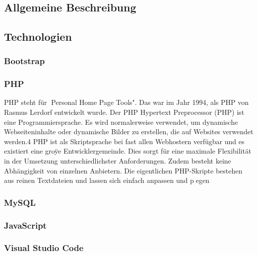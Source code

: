 \chapter{\docname}
\label{\docname}
\section{Allgemeine Beschreibung}

\section{Technologien}


\subsection{Bootstrap}


\subsection{PHP}
PHP steht f\"{u}r Personal Home Page Tools". Das war im Jahr 1994, als PHP
von Rasmus Lerdorf entwickelt wurde. Der PHP Hypertext Preprocessor (PHP)
ist eine Programmiersprache. Es wird normalerweise verwendet, um dynamische
Webseiteninhalte oder dynamische Bilder zu erstellen, die auf Websites verwendet
werden.4 PHP ist als Skriptsprache bei fast allen Webhostern verf\"{u}gbar und es
existiert eine gro\"{y}e Entwicklergemeinde. Dies sorgt f\"{u}r eine maximale Flexibilit\"{a}t
in der Umsetzung unterschiedlichster Anforderungen. Zudem besteht keine Abh\"{a}ngigkeit von einzelnen Anbietern. Die eigentlichen PHP-Skripte bestehen aus
reinen Textdateien und lassen sich einfach anpassen und pegen



\subsection{MySQL}



\subsection{JavaScript}



\subsection{Visual Studio Code}



